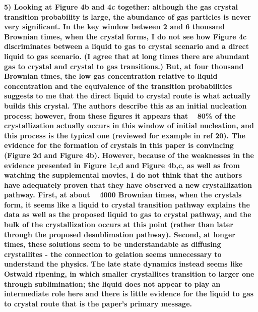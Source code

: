\documentclass[11pt,a4paper]{article}
\newenvironment{referee}%
{\bigskip\singlespacing\bf}%
{\par\bigskip}
\begin{document}
\begin{referee}
5) Looking at Figure 4b and 4c together: although the gas crystal transition probability is large, the abundance of gas particles is never very significant. In the key window between 2 and 6 thousand Brownian times, when the crystal forms, I do not see how Figure 4c discriminates between a liquid to gas to crystal scenario and a direct liquid to gas scenario. (I agree that at long times there are abundant gas to crystal and crystal to gas transitions.) But, at four thousand Brownian times, the low gas concentration relative to liquid concentration and the equivalence of the transition probabilities suggests to me that the direct liquid to crystal route is what actually builds this crystal. The authors describe this as an initial nucleation process; however, from these figures it appears that ~ 80\% of the crystallization actually occurs in this window of initial nucleation, and this process is the typical one (reviewed for example in ref 20).
The evidence for the formation of crystals in this paper is convincing (Figure 2d and Figure 4b). However, because of the weaknesses in the evidence presented in Figure 1c,d and Figure 4b,c, as well as from watching the supplemental movies, I do not think that the authors have adequately proven that they have observed a new crystallization pathway. First, at about ~ 4000 Brownian times, when the crystals form, it seems like a liquid to crystal transition pathway explains the data as well as the proposed liquid to gas to crystal pathway, and the bulk of the crystallization occurs at this point (rather than later through the proposed desublimation pathway). Second, at longer times, these solutions seem to be understandable as diffusing crystallites - the connection to gelation seems unnecessary to understand the physics. The late state dynamics instead seems like Ostwald ripening, in which smaller crystallites transition to larger one through sublimination; the liquid does not appear to play an intermediate 
role here and there is little evidence for the liquid to gas to crystal route that is the paper's primary message.
\end{referee}
\end{document}
